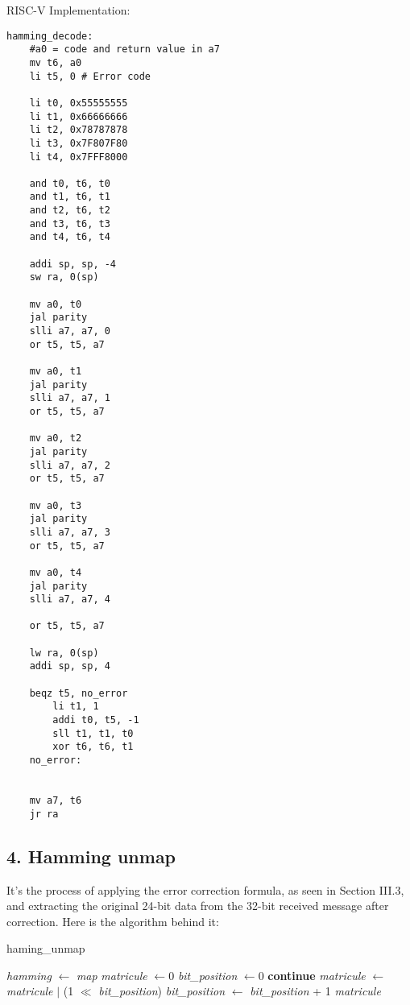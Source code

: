 \documentclass[11pt]{article}
\begin{document}
RISC-V Implementation:

\begin{lstlisting}[language=RISC-V]
hamming_decode:
    #a0 = code and return value in a7
    mv t6, a0 
    li t5, 0 # Error code

    li t0, 0x55555555
    li t1, 0x66666666
    li t2, 0x78787878
    li t3, 0x7F807F80
    li t4, 0x7FFF8000 

    and t0, t6, t0
    and t1, t6, t1
    and t2, t6, t2
    and t3, t6, t3
    and t4, t6, t4

    addi sp, sp, -4
    sw ra, 0(sp)

    mv a0, t0
    jal parity
    slli a7, a7, 0
    or t5, t5, a7

    mv a0, t1
    jal parity
    slli a7, a7, 1
    or t5, t5, a7

    mv a0, t2
    jal parity
    slli a7, a7, 2
    or t5, t5, a7

    mv a0, t3
    jal parity
    slli a7, a7, 3
    or t5, t5, a7

    mv a0, t4
    jal parity
    slli a7, a7, 4

    or t5, t5, a7

    lw ra, 0(sp)
    addi sp, sp, 4

    beqz t5, no_error
        li t1, 1
        addi t0, t5, -1
        sll t1, t1, t0
        xor t6, t6, t1
    no_error:


    mv a7, t6
    jr ra
\end{lstlisting}

\subsection*{4. Hamming unmap}
It's the process of applying the error correction formula, as seen in Section III.3, and extracting the original 24-bit data from the 32-bit received message after correction. Here is the algorithm behind it:

\begin{algorithm}
\caption{haming\_unmap}
\begin{algorithmic}[1]
    \State \textit{hamming} $\gets$ \textit{map} 
    \State \textit{matricule} $\gets 0$
    \State \textit{bit\_position} $\gets 0$
            \State \textbf{continue}
        \Else
                \State \textit{matricule} $\gets$ \textit{matricule} $|$ (1 $\ll$ \textit{bit\_position})
            \EndIf
            \State \textit{bit\_position} $\gets$ \textit{bit\_position} + 1
        \EndIf
    \EndFor
    \State \Return \textit{matricule}
\EndFunction
\end{algorithmic}
\end{algorithm}
\end{document}
